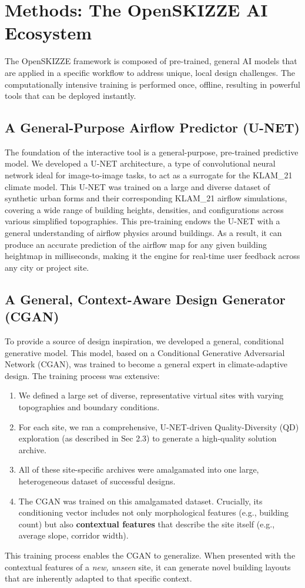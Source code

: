 \documentclass[times,final]{elsarticle}
\begin{document}
\section{Methods: The OpenSKIZZE AI Ecosystem}
The OpenSKIZZE framework is composed of pre-trained, general AI models that are applied in a specific workflow to address unique, local design challenges. The computationally intensive training is performed once, offline, resulting in powerful tools that can be deployed instantly.

\subsection{A General-Purpose Airflow Predictor (U-NET)}
The foundation of the interactive tool is a general-purpose, pre-trained predictive model. We developed a U-NET architecture, a type of convolutional neural network ideal for image-to-image tasks, to act as a surrogate for the KLAM\_21 climate model. This U-NET was trained on a large and diverse dataset of synthetic urban forms and their corresponding KLAM\_21 airflow simulations, covering a wide range of building heights, densities, and configurations across various simplified topographies. This pre-training endows the U-NET with a general understanding of airflow physics around buildings. As a result, it can produce an accurate prediction of the airflow map for any given building heightmap in milliseconds, making it the engine for real-time user feedback across any city or project site.

\subsection{A General, Context-Aware Design Generator (CGAN)}
To provide a source of design inspiration, we developed a general, conditional generative model. This model, based on a Conditional Generative Adversarial Network (CGAN), was trained to become a general expert in climate-adaptive design. The training process was extensive:
\begin{enumerate}
    \item We defined a large set of diverse, representative virtual sites with varying topographies and boundary conditions.
    \item For each site, we ran a comprehensive, U-NET-driven Quality-Diversity (QD) exploration (as described in Sec 2.3) to generate a high-quality solution archive.
    \item All of these site-specific archives were amalgamated into one large, heterogeneous dataset of successful designs.
    \item The CGAN was trained on this amalgamated dataset. Crucially, its conditioning vector includes not only morphological features (e.g., building count) but also \textbf{contextual features} that describe the site itself (e.g., average slope, corridor width).
\end{enumerate}
This training process enables the CGAN to generalize. When presented with the contextual features of a \textit{new, unseen} site, it can generate novel building layouts that are inherently adapted to that specific context.
\end{document}
